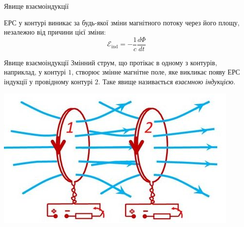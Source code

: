 \documentclass{beamer}
\begin{document}
\begin{frame}{Явище взаємоіндукції}

	ЕРС у контурі виникає за будь-якої зміни магнітного потоку через його площу, незалежно від причини цієї зміни:
	\begin{equation*}
		\mathcal{E}_\text{ind} = -\frac1c \frac{d\Phi}{dt}
	\end{equation*}



	\begin{block}{Явище взаємоіндукції}
		Змінний струм, що протікає в одному з контурів, наприклад, у контурі $ 1 $, створює змінне магнітне поле, яке викликає появу $ ЕРС $ індукції у провідному контурі $ 2 $. Таке явище називається \emph{взаємною індукцією}.
	\end{block}

	\begin{center}
		\includegraphics[width=0.5\linewidth]{interinduction}
	\end{center}
\end{frame}
\end{document}
